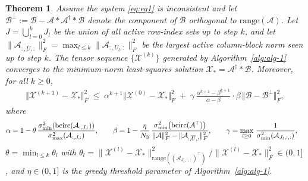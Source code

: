 \documentclass[11pt]{article}
\newtheorem{theorem}{Theorem}[section]
\def\fm#1{\mathcal{#1}}
\begin{document}
\begin{theorem}
Assume the system \eqref{eq:eq1} is inconsistent and let
$\fm B^\perp := \fm B - \fm A * \fm A^\dagger * \fm B$
denote the component of $\fm B$ orthogonal to $\mathrm{range}(\fm A)$.
Let $J = \bigcup_{l=0}^{k} J_l$ be the union of all active row-index sets up to step $k$,
and let $\|\fm A_{:,\overline{U},:}\|_F^2 = \max_{l \leq k}\|\fm A_{:,U_l,:}\|_F^2$
be the largest active column-block norm seen up to step $k$.
The tensor sequence $\{\fm X^{(k)}\}$ generated by Algorithm~\ref{alg:alg-1}
converges to the minimum-norm least-squares solution $\fm X_\ast = \fm A^\dagger * \fm B$.
Moreover, for all $k \geq 0$,
\begin{align}
    \Vert \fm X^{(k+1)} - \fm X_\ast \Vert_F^2
    \;\leq\;
    \alpha^{k+1}\Vert \fm X^{(0)} - \fm X_\ast \Vert_F^2
    \;+\;
    \gamma\,\frac{\alpha^{k+1}-\beta^{k+1}}{\alpha - \beta}
    \cdot\beta
    \,\Vert \fm B - \fm B^\perp \Vert_F^2,
\end{align}
where
\begin{align*}
\alpha &= 1 - \theta\,
    \frac{\sigma_{\min}^2\!\left(\bcirc(\fm A_{:, J,:})\right)}
         {\sigma_{\max}^2\!\left(\fm A_{:, J,:}\right)},
\qquad
\beta  = 1 - \frac{\eta}{N_3}\,
    \frac{\sigma_{\min}^2\!\left(\bcirc(\fm A^\top)\right)}
         {\|\fm A\|_F^2 - \|\fm A_{:,\overline{U},:}\|_F^2},
\qquad
\gamma = \max_{l \geq 0}\,\frac{1}{\sigma_{\min}^2\!\left(\fm A_{J_l,:,:}\right)},
\end{align*}
$\theta = \min_{l \leq k}\theta_l$ with
$\theta_l = \|\fm X^{(l)} - \fm X_\ast\|^2_{\mathrm{range}((\fm A_{J_l,:,:})^\top)}\big/
            \|\fm X^{(l)} - \fm X_\ast\|_F^2 \in (0,1]$,
and $\eta \in (0,1]$ is the greedy threshold parameter of Algorithm~\ref{alg:alg-1}.
\end{theorem}
\end{document}
